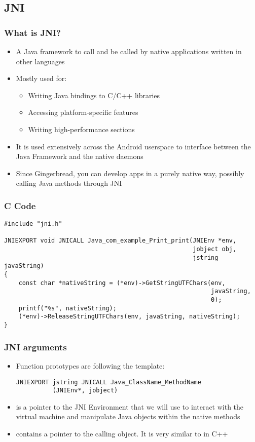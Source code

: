 \subsection{JNI}
\begin{frame}
  \frametitle{What is JNI?}
  \begin{itemize}
  \item A Java framework to call and be called by native applications
    written in other languages
  \item Mostly used for:
    \begin{itemize}
    \item Writing Java bindings to C/C++ libraries
    \item Accessing platform-specific features
    \item Writing high-performance sections
    \end{itemize}
  \item It is used extensively across the Android userspace to
    interface between the Java Framework and the native daemons
  \item Since Gingerbread, you can develop apps in a purely native
    way, possibly calling Java methods through JNI
  \end{itemize}
\end{frame}

\begin{frame}[fragile]
  \frametitle{C Code}
\begin{verbatim}
#include "jni.h"

JNIEXPORT void JNICALL Java_com_example_Print_print(JNIEnv *env,
                                                    jobject obj,
                                                    jstring javaString)
{
    const char *nativeString = (*env)->GetStringUTFChars(env,
                                                         javaString,
                                                         0);
    printf("%s", nativeString);
    (*env)->ReleaseStringUTFChars(env, javaString, nativeString);
}
\end{verbatim}
\end{frame}

\begin{frame}[fragile]
  \frametitle{JNI arguments}
  \begin{itemize}
  \item Function prototypes are following the template:
\begin{verbatim}
JNIEXPORT jstring JNICALL Java_ClassName_MethodName
          (JNIEnv*, jobject)
\end{verbatim}
  \item {} is a pointer to the JNI Environment that we will
    use to interact with the virtual machine and manipulate Java objects
    within the native methods
  \item {} contains a pointer to the calling object. It is very
    similar to  in C++
  \end{itemize}
\end{frame}

